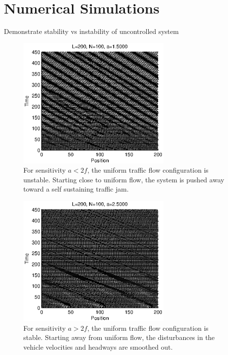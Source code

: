 \documentclass[10pt,twocolumn]{article}
\newcommand{\lm}{\fontfamily{\sfdefault}\selectfont}
\begin{document}
\section{Numerical Simulations}
\label{sec:numer}

Demonstrate stability vs instability of uncontrolled system
\begin{figure}[!h]
\lm
\begin{center}
\includegraphics[width=3in]{instability}
\end{center}
\caption{ \label{fig:instability} For sensitivity $a<2f$, the uniform traffic flow configuration is unstable. Starting close to uniform flow, the system is pushed away toward a self sustaining traffic jam.}
\end{figure}


\begin{figure}[!h]
\lm
\begin{center}
\includegraphics[width=3in]{smoothed}
\end{center}
\caption{ \label{fig:smoothed} For sensitivity $a>2f$, the uniform traffic flow configuration is stable. Starting away from uniform flow, the disturbances in the vehicle velocities and headways are smoothed out.}
\end{figure}
\end{document}

